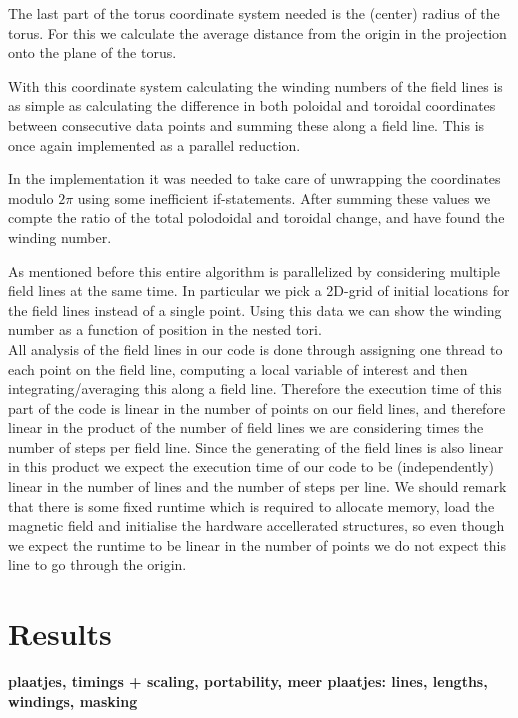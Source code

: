 \documentclass{article}
\begin{document}
The last part of the torus coordinate system needed is the (center) radius of the torus. For this we calculate the average distance from the origin in the projection onto the plane of the torus. %

With this coordinate system calculating the winding numbers of the field lines is as simple as calculating the difference in both poloidal and toroidal coordinates between consecutive data points and summing these along a field line. This is once again implemented as a parallel reduction.

In the implementation it was needed to take care of unwrapping the coordinates modulo $2\pi$ using some inefficient if-statements. %
After summing these values we compte the ratio of the total polodoidal and toroidal change, and have found the winding number.

As mentioned before this entire algorithm is parallelized by considering multiple field lines at the same time. In particular we pick a 2D-grid of initial locations for the field lines instead of a single point. Using this data we can show the winding number as a function of position in the nested tori.\\

All analysis of the field lines in our code is done through assigning one thread to each point on the field line, computing a local variable of interest and then integrating/averaging this along a field line. Therefore the execution time of this part of the code is linear in the number of points on our field lines, and therefore linear in the product of the number of field lines we are considering times the number of steps per field line. Since the generating of the field lines is also linear in this product we expect the execution time of our code to be (independently) linear in the number of lines and the number of steps per line. We should remark that there is some fixed runtime which is required to allocate memory, load the magnetic field and initialise the hardware accellerated structures, so even though we expect the runtime to be linear in the number of points we do not expect this line to go through the origin.

\section{Results}
{\bf plaatjes, timings + scaling, portability, meer plaatjes: lines, lengths, windings, masking}
\end{document}
